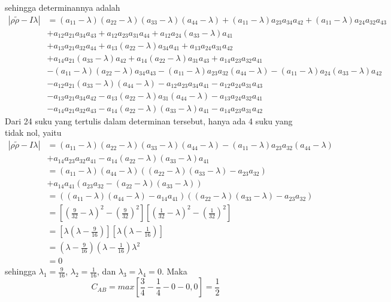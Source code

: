 sehingga determinannya adalah
\begin{equation}
	\begin{aligned}
		|\rho \tilde{\rho}-I\lambda|
		&=(a_{11}-\lambda)(a_{22}-\lambda)(a_{33}-\lambda)(a_{44}-\lambda)
		+(a_{11}-\lambda)a_{23}a_{34}a_{42}
		+(a_{11}-\lambda)a_{24}a_{32}a_{43}
		\nonumber\\
		&
		+a_{12}a_{21}a_{34}a_{43}
		+a_{12}a_{23}a_{31}a_{44}
		+a_{12}a_{24}(a_{33}-\lambda)a_{41}
		\nonumber\\
		&
		+a_{13}a_{21}a_{32}a_{44}
		+a_{13}(a_{22}-\lambda)a_{34}a_{41}
		+a_{13}a_{24}a_{31}a_{42}
		\nonumber\\
		&
		+a_{14}a_{21}(a_{33}-\lambda)a_{42}
		+a_{14}(a_{22}-\lambda)a_{31}a_{43}
		+a_{14}a_{23}a_{32}a_{41}
		\nonumber\\
		&
		-(a_{11}-\lambda)(a_{22}-\lambda)a_{34}a_{43}
		-(a_{11}-\lambda)a_{23}a_{32}(a_{44}-\lambda)
		-(a_{11}-\lambda)a_{24}(a_{33}-\lambda)a_{42}
		\nonumber\\
		&
		-a_{12}a_{21}(a_{33}-\lambda)(a_{44}-\lambda)
		-a_{12}a_{23}a_{34}a_{41}
		-a_{12}a_{24}a_{31}a_{43}
		\nonumber\\
		&
		-a_{13}a_{21}a_{34}a_{42}
		-a_{13}(a_{22}-\lambda)a_{31}(a_{44}-\lambda)
		-a_{13}a_{24}a_{32}a_{41}
		\nonumber\\
		&
		-a_{14}a_{21}a_{32}a_{43}
		-a_{14}(a_{22}-\lambda)(a_{33}-\lambda)a_{41}
		-a_{14}a_{23}a_{31}a_{42}
	\end{aligned}
\end{equation}
Dari 24 suku yang tertulis dalam determinan tersebut, hanya ada 4 suku yang tidak nol, yaitu
\begin{equation}
	\begin{aligned}
		|\rho \tilde{\rho}-I\lambda|
		&=(a_{11}-\lambda)(a_{22}-\lambda)(a_{33}-\lambda)(a_{44}-\lambda)-(a_{11}-\lambda)a_{23}a_{32}(a_{44}-\lambda)\\
		&+a_{14}a_{23}a_{32}a_{41}-a_{14}(a_{22}-\lambda)(a_{33}-\lambda)a_{41}\\
		&=(a_{11}-\lambda)(a_{44}-\lambda)((a_{22}-\lambda)(a_{33}-\lambda)-a_{23}a_{32})\\
		&+a_{14}a_{41}(a_{23}a_{32}-(a_{22}-\lambda)(a_{33}-\lambda))\\
		&=((a_{11}-\lambda)(a_{44}-\lambda)-a_{14}a_{41})((a_{22}-\lambda)(a_{33}-\lambda)-a_{23}a_{32})\\
		&=[(\frac{9}{32}-\lambda)^2-(\frac{9}{32})^2][(\frac{1}{32}-\lambda)^2-(\frac{1}{32})^2]\\
		&=[\lambda(\lambda-\frac{9}{16})][\lambda(\lambda-\frac{1}{16})]\\
		&=(\lambda-\frac{9}{16})(\lambda-\frac{1}{16})\lambda^2\\
		&=0
	\end{aligned}
\end{equation}
sehingga $\lambda_1=\frac{9}{16}$, $\lambda_2=\frac{1}{16}$, dan $\lambda_3=\lambda_4=0$. Maka
\begin{equation}
	C_{AB}=max[\frac{3}{4}-\frac{1}{4}-0-0,0]=\frac{1}{2}
\end{equation}

